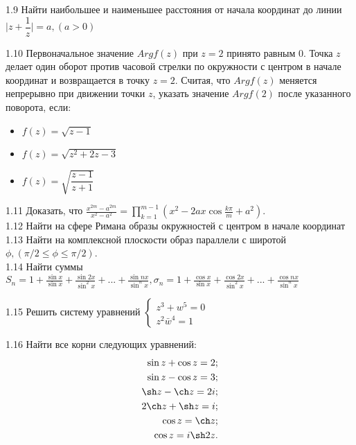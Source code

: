 \documentclass{article}
\begin{document}
1.9 Найти наибольшее и наименьшее расстояния от начала координат до линии $\vert z + \dfrac{1}{z}\vert = a, (a>0)$

1.10 Первоначальное значение $Arg f(z)$ при $z=2$ принято равным 0. Точка $z$ делает один оборот против часовой стрелки по окружности с центром в начале координат и возвращается в точку $z=2$. Считая, что  $Arg f(z)$ меняется непрерывно при движении точки $z$, указать значение $Arg f(2)$ после указанного поворота, если: 
\begin{itemize}
	\item $f(z) = \sqrt{z-1}$
	\item $f(z) = \sqrt{z^2+2z-3}$
	\item $f(z) = \sqrt{\dfrac{z-1}{z+1}}$
\end{itemize}

1.11 Доказать, что $\frac{x^{2m}-a^{2m}}{x^2-a^2}=\prod_{k=1}^{m-1}(x^2-2ax\cos \frac{k\pi}{m}+a^2)$. \\

1.12 Найти на сфере Римана образы окружностей с центром в начале координат \\

1.13 Найти на комплексной плоскости образ параллели с широтой $\phi, (\pi/2\leq\phi\leq\pi/2)$. \\

1.14 Найти суммы $S_n = 1 + \frac{\sin x}{\sin x}+\frac{\sin 2x}{\sin^2 x}+...+\frac{\sin nx}{\sin^nx},\sigma_n = 1 + \frac{\cos x}{\sin x}+\frac{\cos 2x}{\sin^2 x}+...+\frac{\cos nx}{\sin^nx}$

1.15 Решить систему уравнений $\begin{cases} z^3+w^5=0 \\ z^2\bar{w}^4=1  \end{cases}$

1.16 Найти все корни следующих уравнений:
\begin{eqnarray}
\sin z + \cos z = 2;\\
\sin z - \cos z = 3;\\
\sh z - \ch z = 2i;\\
2\ch z + \sh z = i;\\
\cos z = \ch z;\\
\cos z = i \sh 2z.
\end{eqnarray}
\end{document}
